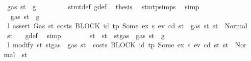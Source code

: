 \begin{isabellebody}
\ {\isachardoublequoteopen}gas\ st\ {\isasymle}\ g{\isachardoublequoteclose}\isanewline
\ \ \ \ \ \ \isamarkupfalse%
\ {}{}\ stmt{\isacharunderscore}{\kern0pt}def\ g{\isacharunderscore}{\kern0pt}def\ \isamarkupfalse%
\ {\isacharquery}{\kern0pt}thesis\ \isamarkupfalse%
\ stmt{\isachardot}{\kern0pt}psimps{\isacharparenleft}{\kern0pt}{}{}{\isacharparenright}{\kern0pt}\ \isamarkupfalse%
\ simp\isanewline
\ \ \ \ \isamarkupfalse%
\isanewline
\ \ \ \ \ \ \isamarkupfalse%
\ {\isachardoublequoteopen}{\isasymnot}\ gas\ st\ {\isasymle}\ g{\isachardoublequoteclose}\isanewline
\ \ \ \ \ \ \isamarkupfalse%
\ \isamarkupfalse%
\ l{}{\isacharcolon}{\kern0pt}\ {\isachardoublequoteopen}assert\ Gas\ {\isacharparenleft}{\kern0pt}{\isasymlambda}st{\isachardot}{\kern0pt}\ costs\ {\isacharparenleft}{\kern0pt}BLOCK\ {\isacharparenleft}{\kern0pt}{\isacharparenleft}{\kern0pt}id{}{\isacharcomma}{\kern0pt}\ tp{\isacharparenright}{\kern0pt}{\isacharcomma}{\kern0pt}\ Some\ ex{\isacharprime}{\kern0pt}{\isacharparenright}{\kern0pt}\ s{\isacharparenright}{\kern0pt}\ e\isactrlsub v\ cd\ st\ {\isacharless}{\kern0pt}\ gas\ st{\isacharparenright}{\kern0pt}\ st\ {\isacharequal}{\kern0pt}\ Normal\ {\isacharparenleft}{\kern0pt}{\isacharparenleft}{\kern0pt}{\isacharparenright}{\kern0pt}{\isacharcomma}{\kern0pt}\ st{\isacharparenright}{\kern0pt}\ {\isachardoublequoteclose}\ \isamarkupfalse%
\ g{\isacharunderscore}{\kern0pt}def\ \isamarkupfalse%
\ simp\isanewline
\ \ \ \ \ \ \isamarkupfalse%
\ st{\isacharprime}{\kern0pt}\ \ {\isachardoublequoteopen}st{\isacharprime}{\kern0pt}\ {\isacharequal}{\kern0pt}\ st{\isasymlparr}gas\ {\isacharcolon}{\kern0pt}{\isacharequal}{\kern0pt}\ gas\ st\ {\isacharminus}{\kern0pt}\ g{\isasymrparr}{\isachardoublequoteclose}\isanewline
\ \ \ \ \ \ \isamarkupfalse%
\ \isamarkupfalse%
\ l{}{\isacharcolon}{\kern0pt}\ {\isachardoublequoteopen}modify\ {\isacharparenleft}{\kern0pt}{\isasymlambda}st{\isachardot}{\kern0pt}\ st{\isasymlparr}gas\ {\isacharcolon}{\kern0pt}{\isacharequal}{\kern0pt}\ gas\ st\ {\isacharminus}{\kern0pt}\ costs\ {\isacharparenleft}{\kern0pt}BLOCK\ {\isacharparenleft}{\kern0pt}{\isacharparenleft}{\kern0pt}id{}{\isacharcomma}{\kern0pt}\ tp{\isacharparenright}{\kern0pt}{\isacharcomma}{\kern0pt}\ Some\ ex{\isacharprime}{\kern0pt}{\isacharparenright}{\kern0pt}\ s{\isacharparenright}{\kern0pt}\ e\isactrlsub v\ cd\ st{\isasymrparr}{\isacharparenright}{\kern0pt}\ st\ {\isacharequal}{\kern0pt}\ Normal\ {\isacharparenleft}{\kern0pt}{\isacharparenleft}{\kern0pt}{\isacharparenright}{\kern0pt}{\isacharcomma}{\kern0pt}\ st{\isacharprime}{\kern0pt}{\isacharparenright}{\kern0pt}{\isachardoublequoteclose}\ \isamarkupfalse%

\end{isabellebody}
